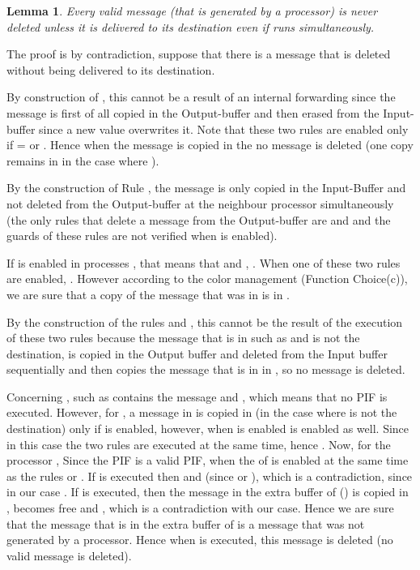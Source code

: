 \documentclass{llncs}
\renewenvironment{proof}{{\it Proof. } }{{\hfill }\vspace{.5pc}}
\newtheorem{lem}{Lemma}
\begin{document}
\begin{lem}\label{KeepMSG}
Every valid message (that is generated by a processor) is never deleted unless it is delivered to its destination even
if   runs simultaneously.
\end{lem}  

\begin{proof}
The proof is by contradiction, suppose that there is a message  that is deleted without being delivered to its destination. 


By construction of , this cannot be a result of an internal forwarding since the message  is first of all copied in the Output-buffer  and then erased from the Input-buffer  since a new value overwrites it. Note that these two rules are enabled only if = or . Hence when the message  is copied in the  no message is deleted (one copy remains in  in the case where ). 

By the construction of Rule ,  the message is only copied in the Input-Buffer and not deleted from the Output-buffer at the neighbour processor simultaneously (the only rules that delete a message from the Output-buffer are  and  and the guards of these rules are not verified when  is enabled).

If  is enabled in processes , that means that  and , . When one of these two rules are enabled, . However according to the color management (Function Choice(c)),  we are sure that a copy of the message that was in  is in . 

By the construction of the rules  and , this cannot be the result of the execution of these two rules because the message that is in  such as  and  is not the destination, is copied in the Output buffer and deleted from the Input buffer sequentially and then  copies the message that is in  in  , so no message is deleted.

Concerning ,  such as  contains the message  and , which means that no PIF is executed. However, for , a message in  is copied in   (in the case where  is not the destination) only if  is enabled, however, when  is enabled  is enabled as well. Since in this case the two rules are executed at the same time, hence . Now, for the processor , Since the PIF is a valid PIF, when the  of  is enabled at the same time as the rules  or . If  is executed then  and  (since  or ), which is a contradiction, since in our case . If  is executed, then the message in the extra buffer of  () is copied in ,  becomes free and , which is a contradiction with our case. Hence we are sure that the message that is in the extra buffer of  is a message that was not generated by a processor. Hence when  is executed, this message is deleted (no valid message is deleted).


\end{proof}
\end{document}
